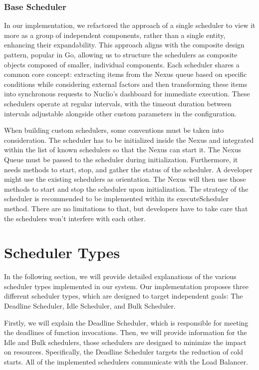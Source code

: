 \subsubsection{Base Scheduler}
\label{sec:base-scheduler}

In our implementation, we refactored the approach of a single scheduler to view it more as a group of independent components, rather than a single entity, enhancing their expandability. This approach aligns with the composite design pattern, popular in Go, allowing us to structure the schedulers as composite objects composed of smaller, individual components. Each scheduler shares a common core concept: extracting items from the Nexus queue based on specific conditions while considering external factors and then transforming these items into synchronous requests to Nuclio's dashboard for immediate execution. These schedulers operate at regular intervals, with the timeout duration between intervals adjustable alongside other custom parameters in the configuration.

When building custom schedulers, some conventions must be taken into consideration. The scheduler has to be initialized inside the Nexus and integrated within the list of known schedulers so that the Nexus can start it. The Nexus Queue must be passed to the scheduler during initialization. Furthermore, it needs methods to start, stop, and gather the status of the scheduler. A developer might use the existing schedulers as orientation. The Nexus will then use those methods to start and stop the scheduler upon initialization. The strategy of the scheduler is recommended to be implemented within its executeScheduler method. There are no limitations to that, but developers have to take care that the schedulers won't interfere with each other.


\section{Scheduler Types}
\label{sec:scheduler-types}
In the following section, we will provide detailed explanations of the various scheduler types implemented in our system. Our implementation proposes three different scheduler types, which are designed to target independent goals: The Deadline Scheduler, Idle Scheduler, and Bulk Scheduler.

Firstly, we will explain the Deadline Scheduler, which is responsible for meeting the deadlines of function invocations. Then, we will provide information for the Idle and Bulk schedulers, those schedulers are designed to minimize the impact on resources. Specifically, the Deadline Scheduler targets the reduction of cold starts. All of the implemented schedulers communicate with the Load Balancer.

